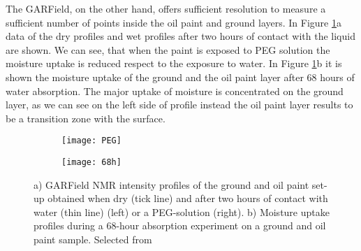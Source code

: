 \documentclass[a4paper,11pt]{report}
\begin{document}
  
  
  
  
  The GARField, on the other hand, offers sufficient resolution to measure a sufficient number of points inside the oil paint and ground layers. In Figure \ref{Garfield}a data of the dry profiles and wet profiles after two hours of contact with the liquid are shown. We can see, that when the paint is exposed to PEG solution the moisture uptake is reduced respect to the exposure to water. In Figure \ref{Garfield}b it is shown the moisture uptake of the ground and the oil paint layer after 68 hours of water absorption. The major uptake of moisture is concentrated on   the ground layer, as we can see on the left side of profile instead the oil paint layer results to be a transition zone with the surface. 
  
   \begin{figure}[h]

\begin{subfigure}{0.5\textwidth}
\texttt{[image: PEG]} 
\caption{}

\end{subfigure}
\begin{subfigure}{0.5\textwidth}
\texttt{[image: 68h]}
\caption{}

\end{subfigure}
 


\caption{ a) GARField NMR intensity profiles of the ground and oil paint set-up obtained when dry (tick line) and after two hours of contact with water (thin line) (left) or a PEG-solution (right). b) Moisture uptake profiles during a 68-hour absorption experiment on a ground and oil paint sample. Selected from \cite{duepaint}}\label{Garfield}
\end{figure}

  
  
\end{document}
